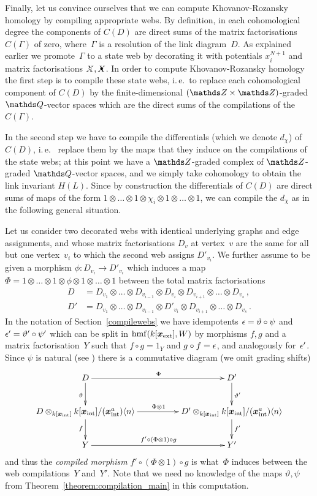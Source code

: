 \documentclass{compositio}
\theoremstyle{definition}
\numberwithin{equation}{section}
\DeclareMathOperator{\hmf}{hmf}
\begin{document}
\medskip

Finally, let us convince ourselves that we can compute Khovanov-Rozansky homology by compiling appropriate webs. By definition, in each cohomological degree the components of $C(D)$ are direct sums of the matrix factorisations $C(\Gamma)$ of zero, where~$\Gamma$ is a resolution of the link diagram~$D$. As explained earlier we promote~$\Gamma$ to a state web by decorating it with potentials $x_{i}^{N+1}$ and matrix factorisations $\Xcirc, \Xbul$. In order to compute Khovanov-Rozansky homology the first step is to compile these state webs, i.\,e.~to replace each cohomological component of $C(D)$ by the finite-dimensional $(\nZ\times\nZ)$-graded $\nQ$-vector spaces which are the direct sums of the compilations of the $C(\Gamma)$. 

In the second step we have to compile the differentials (which we denote $d_{\chi}$) of $C(D)$, i.\,e.~ replace them by the maps that they induce on the compilations of the state webs; at this point we have a $\ZZ$-graded complex of $\ZZ$-graded $\QQ$-vector spaces, and we simply take cohomology to obtain the link invariant $H(L)$. Since by construction the differentials of $C(D)$ are direct sums of maps of the form $1\otimes\ldots\otimes 1\otimes\chi_{i}\otimes 1\otimes\ldots\otimes 1$, we can compile the $d_{\chi}$ as in the following general situation. 

Let us consider two decorated webs with identical underlying graphs and edge assignments, and whose matrix factorisations $D_{v}$ at vertex~$v$ are the same for all but one vertex~$v_{i}$ to which the second web assigns $D'_{v_{i}}$. We further assume to be given a morphism $\phi:D_{v_{i}}\longrightarrow D'_{v_{i}}$ which induces a map $\Phi=1\otimes\ldots\otimes 1\otimes\phi\otimes 1\otimes\ldots\otimes 1$ between the total matrix factorisations
\begin{align*}
D & =D_{v_{1}}\otimes\ldots\otimes D_{v_{i-1}} \otimes D_{v_{i}} \otimes D_{v_{i+1}}\otimes\ldots\otimes D_{v_{s}} \, , \\
D' & =D_{v_{1}}\otimes\ldots\otimes D_{v_{i-1}} \otimes D'_{v_{i}} \otimes D_{v_{i+1}}\otimes\ldots\otimes D_{v_{s}} \, .
\end{align*}
In the notation of Section~\ref{compilewebs} we have idempotents $\epsilon=\vartheta\circ\psi$ and $\epsilon'=\vartheta'\circ\psi'$ which can be split in $\hmf(k[\extvar],W)$ by morphisms $f,g$ and a matrix factorisation~$Y$ such that $f\circ g= 1_{Y}$ and $g\circ f=\epsilon$, and analogously for~$\epsilon'$. Since $\psi$ is natural (see \cite[Lemma 7.6]{dm1102.2957}) there is a commutative diagram (we omit grading shifts)
$$
\xymatrix@C+2pc{%
D \ar[d]_{\vartheta}\ar[r]^{\Phi} & D'\ar[d]^{\vartheta'}\\
D \otimes_{k[\intvar]} k[\intvar]/(\intvar^a)\langle n \rangle \ar[d]_{f}\ar[r]^{\Phi \otimes 1} & D' \otimes_{k[\intvar]} k[\intvar]/(\intvar^a)\langle n \rangle \ar[d]^{f'}\\
Y \ar[r]^{f' \circ (\Phi \otimes 1) \circ g} & Y'
}
$$
and thus the \emph{compiled morphism} $f'\circ(\Phi\otimes 1)\circ g$ is what~$\Phi$ induces between the web compilations~$Y$ and~$Y'$. Note that we need no knowledge of the maps $\vartheta,\psi$ from Theorem~\ref{theorem:compilation_main} in this computation. 
\end{document}
